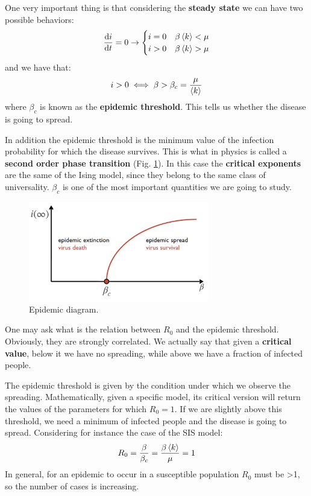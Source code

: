 \documentclass[../main/main.tex]{subfiles}
\begin{document}
One very important thing is that considering the \textbf{steady state} we can have two possible behaviors:
\begin{equation*}
  \dv{i}{t} = 0 \rightarrow  \begin{cases}
   i=0 & \beta \expval{k} < \mu  \\
   i>0 & \beta \expval{k} > \mu
  \end{cases}
\end{equation*}
and we have that:
\begin{equation}
  i>0 \iff \beta > \beta_c = \frac{\mu }{ \expval{k} }
\end{equation}
where $\beta_c$ is known as the \textbf{epidemic threshold}. This tells us whether the disease is going to spread.

In addition the epidemic threshold is the minimum value of the infection probability for which the disease survives. This is what in physics is called a \textbf{second order phase transition} (Fig. \ref{fig:3_5}). In this case the \textbf{critical exponents} are the same of the Ising model, since they belong to the same class of universality. $\beta_c$ is one of the most important quantities we are going to study.

\begin{figure}[h!]
\centering
\includegraphics[width=0.7\textwidth]{../lessons/image/03/5.png}
\caption{\label{fig:3_5} Epidemic diagram.}
\end{figure}

One may ask what is the relation between \( R_0 \) and the epidemic threshold. Obviously, they are strongly correlated. We actually say that given a \textbf{critical value}, below it we have no spreading, while above we have a fraction of infected people.

The epidemic threshold is given by the condition under which we observe the spreading. Mathematically, given a specific model, its critical version will return the values of the parameters for which $ R_0 = 1 $. If we are slightly above this threshold, we need a minimum of infected people and the disease is going to spread. Considering for instance the case of the SIS model:
\begin{equation}
  R_0 = \frac{\beta}{\beta_c} =  \frac{\beta \expval{k} }{\mu } = 1
\end{equation}
In general, for an epidemic to occur in a susceptible population $R_0$ must be >1, so the number of cases is increasing.
\end{document}
